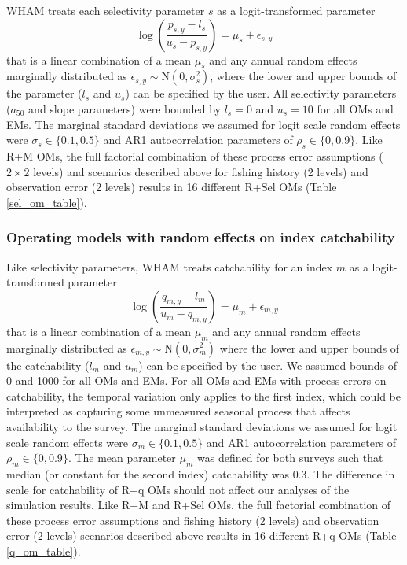 \documentclass[
  12pt,
]{article}
\begin{document}
WHAM treats each selectivity parameter \(s\) as a logit-transformed
parameter \[
\log\left(\frac{p_{s,y}-l_{s}}{u_{s}-p_{s,y}}\right) = \mu_s + \epsilon_{s,y}
\] that is a linear combination of a mean \(\mu_s\) and any annual
random effects marginally distributed as
\(\epsilon_{s,y} \sim \text{N}\left(0,\sigma_s^2\right)\), where the
lower and upper bounds of the parameter (\(l_s\) and \(u_s\)) can be
specified by the user. All selectivity parameters (\(a_{50}\) and slope
parameters) were bounded by \(l_s = 0\) and \(u_s = 10\) for all OMs and
EMs. The marginal standard deviations we assumed for logit scale random
effects were \(\sigma_s \in \{0.1, 0.5\}\) and AR1 autocorrelation
parameters of \(\rho_s \in \{0,0.9\}\). Like R+M OMs, the full factorial
combination of these process error assumptions (\(2\times2\) levels) and
scenarios described above for fishing history (2 levels) and observation
error (2 levels) results in 16 different R+Sel OMs (Table
\ref{sel_om_table}).

\subsubsection*{Operating models with random effects on index
catchability}\label{operating-models-with-random-effects-on-index-catchability}

Like selectivity parameters, WHAM treats catchability for an index \(m\)
as a logit-transformed parameter \[
\log\left(\frac{q_{m,y}-l_{m}}{u_{m}-q_{m,y}}\right) = \mu_m + \epsilon_{m,y}
\] that is a linear combination of a mean \(\mu_m\) and any annual
random effects marginally distributed as
\(\epsilon_{m,y} \sim \text{N}\left(0,\sigma_m^2\right)\) where the
lower and upper bounds of the catchability (\(l_m\) and \(u_m\)) can be
specified by the user. We assumed bounds of 0 and 1000 for all OMs and
EMs. For all OMs and EMs with process errors on catchability, the
temporal variation only applies to the first index, which could be
interpreted as capturing some unmeasured seasonal process that affects
availability to the survey. The marginal standard deviations we assumed
for logit scale random effects were \(\sigma_m \in \{0.1, 0.5\}\) and
AR1 autocorrelation parameters of \(\rho_m \in \{0,0.9\}\). The mean
parameter \(\mu_m\) was defined for both surveys such that median (or
constant for the second index) catchability was 0.3. The difference in
scale for catchability of R+q OMs should not affect our analyses of the
simulation results. Like R+M and R+Sel OMs, the full factorial
combination of these process error assumptions and fishing history (2
levels) and observation error (2 levels) scenarios described above
results in 16 different R+q OMs (Table \ref{q_om_table}).
\end{document}
